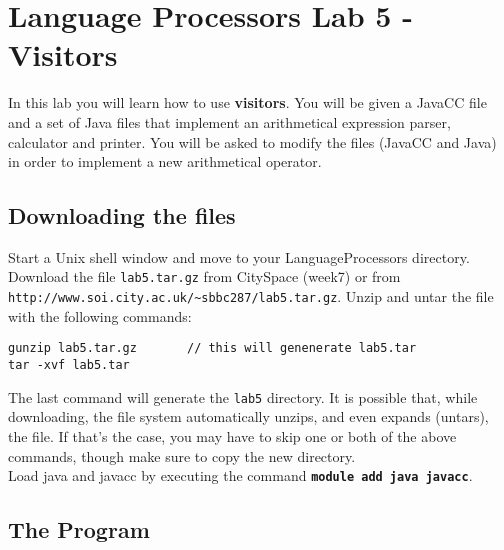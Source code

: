 \documentclass{article}
\begin{document}
\thispagestyle{empty}

\newcommand{\negra}[1]{\textbf{#1}}

\section*{Language Processors Lab 5 - Visitors }

\medskip\noindent In this lab you will learn how to use \textbf{visitors}. You will be given a JavaCC file and a set of Java files that implement an arithmetical expression parser, calculator and  printer. You will be asked to modify the files (JavaCC and Java) in order to implement a new arithmetical operator.

\subsection*{Downloading the files}

Start a Unix shell window and move to your LanguageProcessors directory. Download the file {\tt lab5.tar.gz} from CitySpace (week7) or from \verb+http://www.soi.city.ac.uk/~sbbc287/lab5.tar.gz+. Unzip and untar the file with the following commands:

\begin{verbatim}
gunzip lab5.tar.gz       // this will genenerate lab5.tar
tar -xvf lab5.tar
\end{verbatim}

The last command will generate the {\tt lab5} directory. It is possible that, while downloading, the file system automatically unzips, and even expands (untars), the file. If that's the case, you may have to skip one or both of the above commands, though make sure to copy the new directory. \\
Load java and javacc by executing the command 
{\textbf {\tt module add java javacc}}.


\subsection*{The Program}
\end{document}
